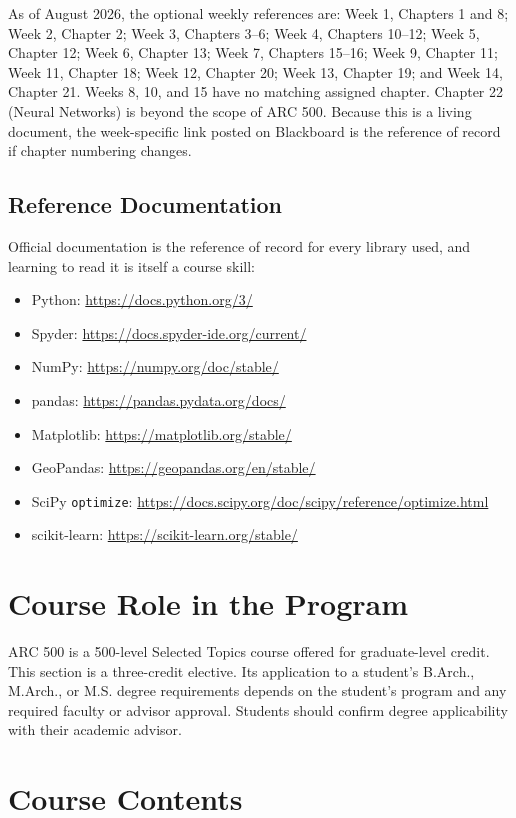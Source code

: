 \documentclass[11pt]{article}
\newcommand{\ProgramRole}{ARC 500 is a 500-level Selected Topics course offered for
  graduate-level credit. This section is a three-credit elective. Its application to a
  student's B.Arch., M.Arch., or M.S. degree requirements depends on the student's program
  and any required faculty or advisor approval. Students should confirm degree applicability
  with their academic advisor.}
\begin{document}
As of August 2026, the optional weekly references are: Week 1, Chapters 1 and 8; Week 2,
Chapter 2; Week 3, Chapters 3--6; Week 4, Chapters 10--12; Week 5, Chapter 12; Week 6,
Chapter 13; Week 7, Chapters 15--16; Week 9, Chapter 11; Week 11, Chapter 18; Week 12,
Chapter 20; Week 13, Chapter 19; and Week 14, Chapter 21. Weeks 8, 10, and 15 have no matching
assigned chapter. Chapter 22 (Neural Networks) is beyond the scope of ARC 500. Because this is
a living document, the week-specific link posted on Blackboard is the reference of record if
chapter numbering changes.

\subsection{Reference Documentation}

Official documentation is the reference of record for every library used, and learning to read
it is itself a course skill:

\begin{itemize}
  \item Python: \url{https://docs.python.org/3/}
  \item Spyder: \url{https://docs.spyder-ide.org/current/}
  \item NumPy: \url{https://numpy.org/doc/stable/}
  \item pandas: \url{https://pandas.pydata.org/docs/}
  \item Matplotlib: \url{https://matplotlib.org/stable/}
  \item GeoPandas: \url{https://geopandas.org/en/stable/}
  \item SciPy \texttt{optimize}: \url{https://docs.scipy.org/doc/scipy/reference/optimize.html}
  \item scikit-learn: \url{https://scikit-learn.org/stable/}
\end{itemize}

\section{Course Role in the Program}

\ProgramRole

\section{Course Contents}
\end{document}
